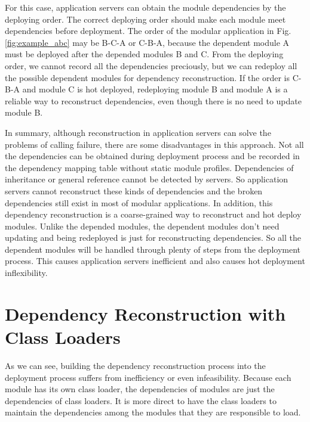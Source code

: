 \documentclass[conference]{IEEEtran}
\begin{document}
For this case, application servers can obtain the module dependencies by the deploying order. The correct deploying order should make each module meet dependencies before deployment. The order of the modular application in Fig. \ref{fig:example_abc} may be B-C-A or C-B-A, because the dependent module A must be deployed after the depended modules B and C. From the deploying order, we cannot record all the dependencies preciously, but we can redeploy all the possible dependent modules for dependency reconstruction. If the order is C-B-A and module C is hot deployed, redeploying module B and module A is a reliable way to reconstruct dependencies, even though there is no need to update module B.

In summary, although reconstruction in application servers can solve the problems of calling failure, there are some disadvantages in this approach.
Not all the dependencies can be obtained during deployment process and be recorded in the dependency mapping table without static module profiles.
Dependencies of inheritance or general reference cannot be detected by servers.
So application servers cannot reconstruct these kinds of dependencies and the broken dependencies still exist in most of modular applications.
In addition, this dependency reconstruction is a coarse-grained way to reconstruct and hot deploy modules.
Unlike the depended modules, the dependent modules don't need updating and being redeployed is just for reconstructing dependencies.
So all the dependent modules will be handled through plenty of steps from the deployment process.
This causes application servers inefficient and also causes hot deployment inflexibility.


 
 
\section{Dependency Reconstruction with Class Loaders\label{sec:reconstructionCL}}

As we can see, building the dependency reconstruction process into the deployment process suffers from inefficiency or even infeasibility. 
Because each module has its own class loader, the dependencies of modules are just the dependencies of class loaders. 
It is more direct to have the class loaders to maintain the dependencies among the modules that they are responsible to load. 
\end{document}
